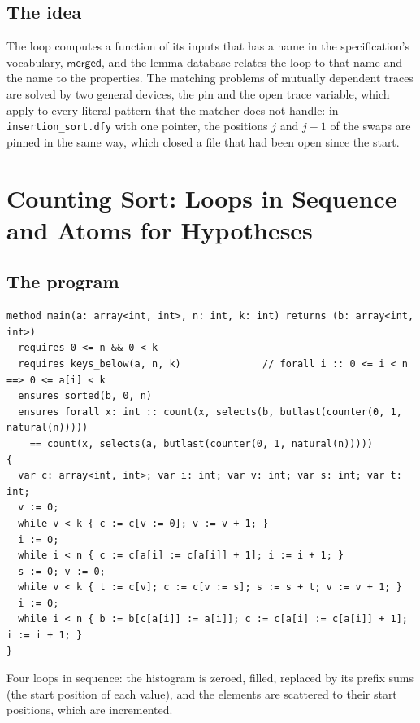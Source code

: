 \documentclass[11pt,a4paper]{article}
\begin{document}
\subsection{The idea}
The loop computes a function of its inputs that has a name in the specification's vocabulary,
$\mathsf{merged}$, and the lemma database relates the loop to that name and the name to the properties.
The matching problems of mutually dependent traces are solved by two general devices, the pin and the
open trace variable, which apply to every literal pattern that the matcher does not handle: in
\texttt{insertion\_sort.dfy} with one pointer, the positions $j$ and $j - 1$ of the swaps are pinned in
the same way, which closed a file that had been open since the start.

\section{Counting Sort: Loops in Sequence and Atoms for Hypotheses}

\subsection{The program}
\begin{lstlisting}
method main(a: array<int, int>, n: int, k: int) returns (b: array<int, int>)
  requires 0 <= n && 0 < k
  requires keys_below(a, n, k)              // forall i :: 0 <= i < n ==> 0 <= a[i] < k
  ensures sorted(b, 0, n)
  ensures forall x: int :: count(x, selects(b, butlast(counter(0, 1, natural(n)))))
    == count(x, selects(a, butlast(counter(0, 1, natural(n)))))
{
  var c: array<int, int>; var i: int; var v: int; var s: int; var t: int;
  v := 0;
  while v < k { c := c[v := 0]; v := v + 1; }
  i := 0;
  while i < n { c := c[a[i] := c[a[i]] + 1]; i := i + 1; }
  s := 0; v := 0;
  while v < k { t := c[v]; c := c[v := s]; s := s + t; v := v + 1; }
  i := 0;
  while i < n { b := b[c[a[i]] := a[i]]; c := c[a[i] := c[a[i]] + 1]; i := i + 1; }
}
\end{lstlisting}
Four loops in sequence: the histogram is zeroed, filled, replaced by its prefix sums (the start position
of each value), and the elements are scattered to their start positions, which are incremented.
\end{document}
